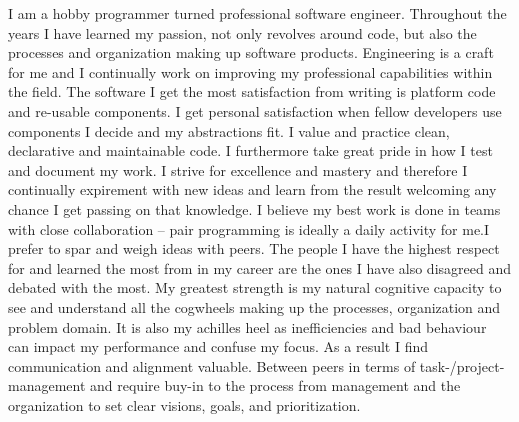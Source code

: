 
I am a hobby programmer turned professional software engineer. Throughout the years I have learned my passion, not only revolves around code, but also the processes and organization making up software products.
\newline\newline
Engineering is a craft for me and I continually work on improving my professional capabilities within the field.
\newline\newline
The software I get the most satisfaction from writing is platform code and re-usable components. I get personal satisfaction when fellow developers use components I decide and my abstractions fit.
\newline\newline
I value and practice clean, declarative and maintainable code. I furthermore take great pride in how I test and document my work. I strive for excellence and mastery and therefore I continually expirement with new ideas and learn from the result welcoming any chance I get passing on that knowledge.
\newline\newline
I believe my best work is done in teams with close collaboration -- pair programming is ideally a daily activity for me.I prefer to spar and weigh ideas with peers. The people I have the highest respect for and learned the most from in my career are the ones I have also disagreed and debated with the most.
\newline\newline
My greatest strength is my natural cognitive capacity to see and understand all the cogwheels making up the processes, organization and problem domain. It is also my achilles heel as inefficiencies and bad behaviour can impact my performance and confuse my focus.
\newline\newline
As a result I find communication and alignment valuable. Between peers in terms of task-/project-management and require buy-in to the process from management and the organization to set clear visions, goals, and prioritization.
